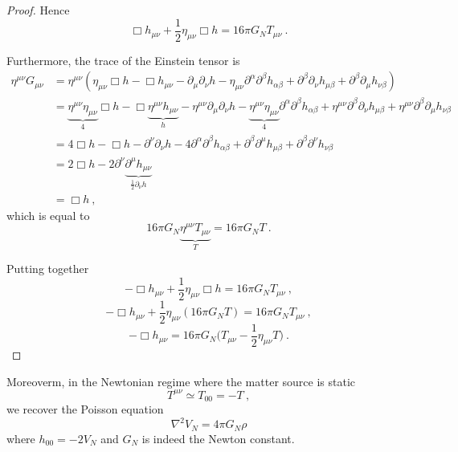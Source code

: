 \begin{proof}
        Hence 
        \begin{equation*}
            \Box h_{\mu\nu} + \frac{1}{2} \eta_{\mu\nu} \Box h = 16 \pi G_N T_{\mu\nu} ~.
        \end{equation*} 

        Furthermore, the trace of the Einstein tensor is 
        \begin{equation*}
        \begin{aligned}
            \eta^{\mu\nu} G_{\mu\nu} & = \eta^{\mu\nu} (\eta_{\mu\nu} \Box h - \Box h_{\mu\nu} - \partial_\mu \partial_\nu h - \eta_{\mu\nu} \partial^\alpha \partial^\beta h_{\alpha\beta} + \partial^\beta \partial_\nu h_{\mu\beta} + \partial^\beta \partial_\mu h_{\nu\beta}) \\ & = \underbrace{\eta^{\mu\nu}\eta_{\mu\nu}}_4 \Box h - \Box \underbrace{\eta^{\mu\nu} h_{\mu\nu}}_h - \eta^{\mu\nu}\partial_\mu \partial_\nu h - \underbrace{\eta^{\mu\nu} \eta_{\mu\nu}}_4 \partial^\alpha \partial^\beta h_{\alpha\beta} + \eta^{\mu\nu} \partial^\beta \partial_\nu h_{\mu\beta} + \eta^{\mu\nu} \partial^\beta \partial_\mu h_{\nu\beta} \\ & = 4 \Box h - \Box h - \partial^\nu \partial_\nu h - 4 \partial^\alpha \partial^\beta h_{\alpha\beta} + \partial^\beta \partial^\mu h_{\mu\beta} + \partial^\beta \partial^\nu h_{\nu\beta} \\ & = 2 \Box h - 2 \partial^\nu \underbrace{\partial^\mu h_{\mu\nu}}_{\frac{1}{2} \partial_\nu h} \\ & = \Box h ~,
        \end{aligned}
        \end{equation*}
        which is equal to 
        \begin{equation*}
            16 \pi G_N \underbrace{\eta^{\mu\nu} T_{\mu\nu}}_T = 16 \pi G_N T ~.
        \end{equation*}

        Putting together
        \begin{equation*}
            - \Box h_{\mu\nu} + \frac{1}{2} \eta_{\mu\nu} \Box h = 16 \pi G_N T_{\mu\nu} ~,
        \end{equation*}
        \begin{equation*}
            - \Box h_{\mu\nu} + \frac{1}{2} \eta_{\mu\nu} (16 \pi G_N T) = 16 \pi G_N T_{\mu\nu} ~,
        \end{equation*}
        \begin{equation*}
            - \Box h_{\mu\nu} = 16 \pi G_N \Big ( T_{\mu\nu} - \frac{1}{2} \eta_{\mu\nu} T) ~.
        \end{equation*}
    \end{proof}

    Moreoverm, in the Newtonian regime where the matter source is static 
    \begin{equation*}
        T^{\mu\nu} \simeq T_{00} = - T ~,
    \end{equation*}
    we recover the Poisson equation
    \begin{equation*}
        \nabla^2 V_N = 4 \pi G_N \rho
    \end{equation*}
    where $h_{00} = - 2 V_N$ and $G_N$ is indeed the Newton constant.

